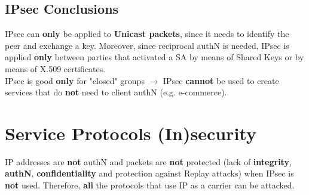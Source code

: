 \subsection{IPsec Conclusions}
IPsec can \textbf{only} be applied to \textbf{Unicast packets}, since it needs to identify the peer and exchange
a key. Moreover, since reciprocal authN is needed, IPsec is applied \textbf{only} between parties that
activated a SA by means of Shared Keys or by means of X.509 certificates.\\
IPsec is good \textbf{only} for "closed" groups \(\rightarrow \) IPsec \textbf{cannot} be used to create services that do
\textbf{not} need to client authN (e.g. e-commerce).
\\
\noindent{\color{gray!50}\rule{\textwidth}{0.5pt}}
\section{Service Protocols (In)security}
IP addresses are \textbf{not} authN and packets are \textbf{not} protected (lack of \textbf{integrity}, \textbf{authN}, \textbf{confidentiality} and protection against Replay attacks) when IPsec is \textbf{not} used. Therefore, \textbf{all} the protocols that use IP as a carrier can be attacked.

